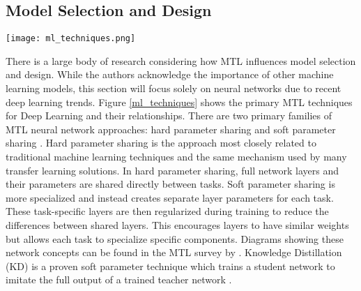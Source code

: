 \documentclass[twocolumn]{article}
\begin{document}
\subsection{Model Selection and Design}
\label{model_design}

\begin{figure*}
	\begin{center}
		\texttt{[image: ml\_techniques.png]}
		\caption{Relationships of Transfer Learning and Multi-Task Learning Techniques for Deep Learning}
		\label{ml_techniques}
	\end{center}
\end{figure*}

There is a large body of research considering how MTL influences model selection and design. While the authors acknowledge the importance of other machine learning models, this section will focus solely on neural networks due to recent deep learning trends. Figure \ref{ml_techniques} shows the primary MTL techniques for Deep Learning and their relationships. There are two primary families of MTL neural network approaches: hard parameter sharing and soft parameter sharing \citep{mtloverview17}. Hard parameter sharing is the approach most closely related to traditional machine learning techniques and the same mechanism used by many transfer learning solutions. In hard parameter sharing, full network layers and their parameters are shared directly between tasks. Soft parameter sharing is more specialized and instead creates separate layer parameters for each task. These task-specific layers are then regularized during training to reduce the differences between shared layers. This encourages layers to have similar weights but allows each task to specialize specific components. Diagrams showing these network concepts can be found in the MTL survey by \cite{mtloverview17}. Knowledge Distillation (KD) is a proven soft parameter technique which trains a student network to imitate the full output of a trained teacher network \citep{kd15}.
\end{document}
